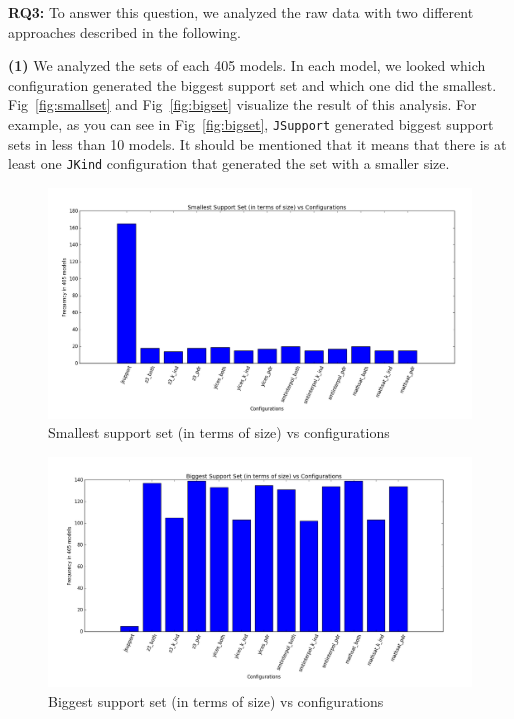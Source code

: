 \noindent{}
 \vspace{9pt}

\textbf{RQ3:} To answer this question, we analyzed the raw data with two different approaches described in the following.
 
\textbf{(1)} We analyzed the sets of each 405 models. In each model, we looked which configuration generated the biggest support set and which one did the smallest. Fig~\ref{fig:smallset} and Fig~\ref{fig:bigset} visualize the result of this analysis. For example, as you can see in Fig~\ref{fig:bigset}, \texttt{JSupport} generated biggest support sets in less than 10 models. It should be mentioned that it means that there is at least one \texttt{JKind} configuration that generated the set with a smaller size.

\begin{figure}
  \centering
  \includegraphics[width=\textwidth]{figs/small_conf.png}
  \caption{Smallest support set (in terms of size) vs configurations}\label{fig:smallest}
\end{figure}

\begin{figure}
  \centering
  \includegraphics[width=\textwidth]{figs/big_conf.png}
  \caption{Biggest support set (in terms of size) vs configurations}\label{fig:bigest}
\end{figure}


